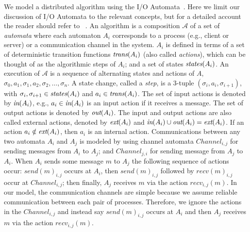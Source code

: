 {%
We model a distributed algorithm using   the I/O Automata~\cite{Lynch1996}.
Here we limit our discussion of I/O Automata to the relevant concepts, but for a detailed account the reader should refer 
to ~\cite{Lynch1996}.
An algorithm is a composition $\mathcal{A}$ of a set of \emph{automata} where each automaton  $A_i$ corresponds to a process (e.g., client or server) or a communication channel in the system.  $A_i$ is defined in terms of
a set of deterministic transition functions  ${\textit{trans}(A_i)}$ (also called \textit{actions}), which can be thought of as the algorithmic steps of $A_i$;  and  a set of states ${\textit{states}(A_i)}$. 
An execution of $\mathcal{A}$ is a sequence of alternating states and actions of $A$,  $\sigma_0, a_1, \sigma_1, a_2, \sigma_2, \ldots, \sigma_n$. 
A state change, called a \textit{step}, is a 3-tuple $(\sigma_i, a_i, \sigma_{i+1})$, with $\sigma_i, \sigma_{i+1} \in {\textit{states}(A_i)}$ and $a_i \in {\textit{trans}(A_i)}$. 
The set of input actions is denoted by ${\textit{in}(A_i)}$, e.g.,  $a_i \in {\textit{in}(A_i)}$ is an input action if it receives a message. The set of output actions is denoted by ${\textit{out}(A_i)}$. The input and output actions are also called external actions, denoted by ${\textit{ext}(A_i)}$ and ${\textit{in}(A_i)} \cup {\textit{out}(A_i)}={\textit{ext}(A_i)}$. If an action $a_i \notin {\textit{ext}(A_i)}$, then $a_i$ is an internal action.
Communications between any two automata $A_i$ and $A_j$ is modeled by using channel automata $Channel_{i, j}$ for sending messages from $A_i$ to $A_j$; and $Channel_{j, i}$ for sending message from $A_j$ to $A_i$. When $A_i$ sends some
message $m$ to $A_j$ the following sequence of actions occur: $send(m)_{i,j}$  occurs at $A_i$, then 
$send(m)_{i,j}$ followed by $recv(m)_{i, j}$ occur at $Channel_{i,j}$; then finally, $A_j$ receives $m$ via the action $recv_{i,j}(m)$.
In our model,  the communication channels are simple because we assume reliable communication between each pair of processes. Therefore, we ignore the actions in the $Channel_{i, j}$ and instead say   $send(m)_{i,j}$  occurs at $A_i$ and then $A_j$ receives $m$ via the action $recv_{i,j}(m)$.
}
